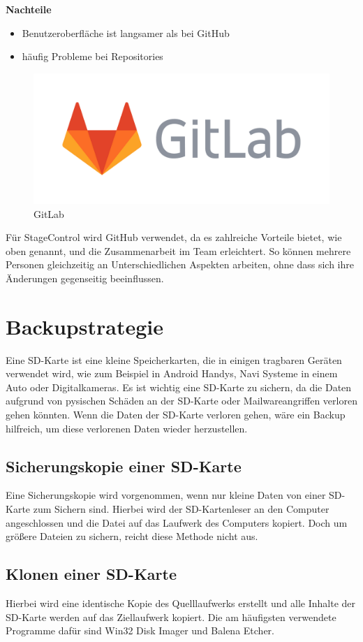 \textbf{Nachteile}
\begin{itemize}
	\item Benutzeroberfläche ist langsamer als bei GitHub
	\item häufig Probleme bei Repositories 
\end{itemize}


\begin{figure}[H]
	\centering
	\includegraphics[width=0.5\linewidth]{images/GitLab.png}
	\caption[GitLab]{GitLab}
	\label{fig:GitLab}
\end{figure}

Für StageControl wird GitHub verwendet, da es zahlreiche Vorteile bietet, wie oben genannt, und die Zusammenarbeit im Team erleichtert. So können mehrere Personen gleichzeitig an Unterschiedlichen Aspekten arbeiten, ohne dass sich ihre Änderungen gegenseitig beeinflussen.

\section{Backupstrategie}
Eine SD-Karte ist eine kleine Speicherkarten, die in einigen tragbaren Geräten verwendet wird, wie zum Beispiel in Android Handys, Navi Systeme in einem Auto oder Digitalkameras. Es ist wichtig eine SD-Karte zu sichern, da die Daten aufgrund von pysischen Schäden an der SD-Karte oder Mailwareangriffen verloren gehen könnten. Wenn die Daten der SD-Karte verloren gehen, wäre ein Backup hilfreich, um diese verlorenen Daten wieder herzustellen.  \parencite{SD-KartenSicherung}

\subsection{Sicherungskopie einer SD-Karte}
Eine Sicherungskopie wird vorgenommen, wenn nur kleine Daten von einer SD-Karte zum Sichern sind. Hierbei wird der SD-Kartenleser an den Computer angeschlossen und die Datei auf das Laufwerk des Computers kopiert. Doch um größere Dateien zu sichern, reicht diese Methode nicht aus. \parencite{SD-KartenSicherung}

\subsection{Klonen einer SD-Karte}
Hierbei wird eine identische Kopie des Quelllaufwerks erstellt und alle Inhalte der SD-Karte werden auf das Ziellaufwerk kopiert. Die am häufigsten verwendete Programme dafür sind Win32 Disk Imager und Balena Etcher. \parencite{SD-KartenSicherung}

